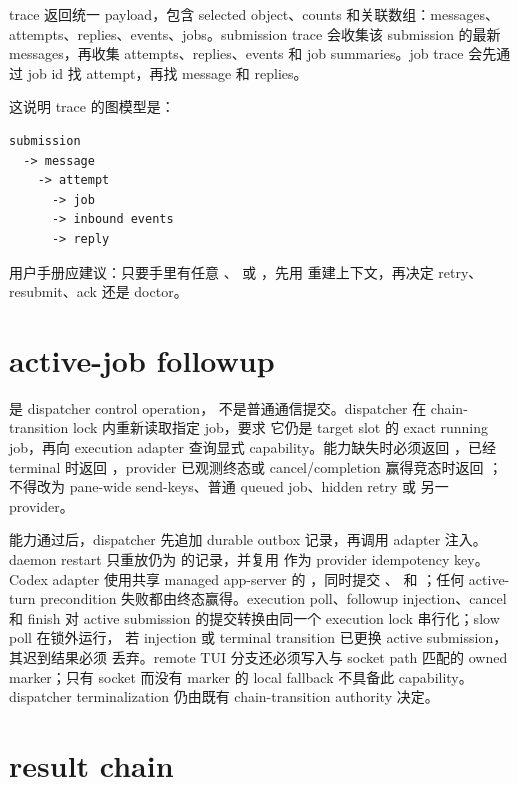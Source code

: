 trace 返回统一 payload，包含 selected object、counts 和关联数组：messages、attempts、replies、events、jobs。submission trace 会收集该 submission 的最新 messages，再收集 attempts、replies、events 和 job summaries。job trace 会先通过 job id 找 attempt，再找 message 和 replies。

这说明 trace 的图模型是：

\begin{Verbatim}[fontsize=\small,frame=single]
submission
  -> message
    -> attempt
      -> job
      -> inbound events
      -> reply
\end{Verbatim}

用户手册应建议：只要手里有任意 、 或 ，先用  重建上下文，再决定 retry、resubmit、ack 还是 doctor。

\section{active-job followup}

 是 dispatcher control operation，
不是普通通信提交。dispatcher 在 chain-transition lock 内重新读取指定 job，要求
它仍是 target slot 的 exact running job，再向 execution adapter 查询显式
capability。能力缺失时必须返回 ，已经 terminal 时返回
，provider 已观测终态或 cancel/completion 赢得竞态时返回
；不得改为 pane-wide send-keys、普通 queued job、hidden retry 或
另一 provider。

能力通过后，dispatcher 先追加  durable outbox 记录，再调用
adapter 注入。daemon restart 只重放仍为  的记录，并复用
 作为 provider idempotency key。Codex adapter 使用共享 managed
app-server 的 ，同时提交 、
 和 ；任何 active-turn precondition
失败都由终态赢得。execution poll、followup injection、cancel 和 finish 对 active
submission 的提交转换由同一个 execution lock 串行化；slow poll 在锁外运行，
若 injection 或 terminal transition 已更换 active submission，其迟到结果必须
丢弃。remote TUI 分支还必须写入与 socket path 匹配的 owned marker；只有 socket
而没有 marker 的 local fallback 不具备此 capability。dispatcher terminalization
仍由既有 chain-transition authority 决定。

\section{result chain}

